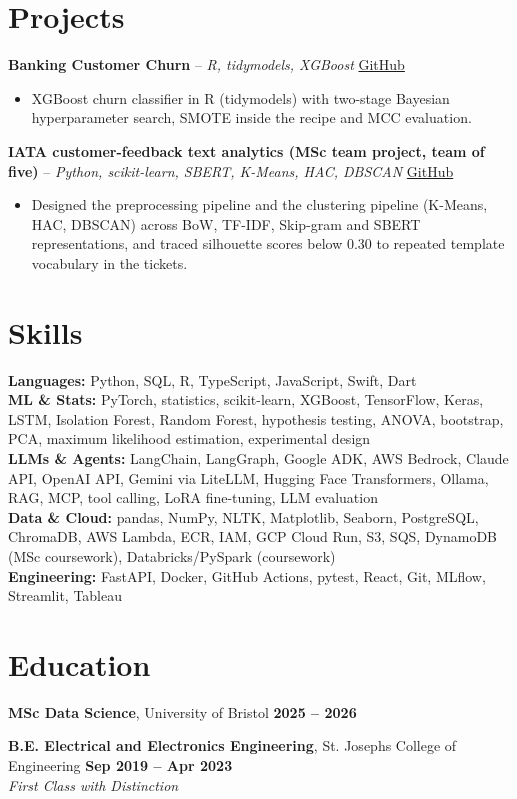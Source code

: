 \documentclass[a4paper,10pt]{article}
\begin{document}
\section{Projects}
\noindent\textbf{Banking Customer Churn} -- \textit{R, tidymodels, XGBoost} \hfill \href{https://github.com/Thiruvel-AP/Banking-Customer-Churn-Prediction}{GitHub}
\begin{itemize}
  \item XGBoost churn classifier in R (tidymodels) with two-stage Bayesian hyperparameter search, SMOTE inside the recipe and MCC evaluation.
\end{itemize}
\noindent\textbf{IATA customer-feedback text analytics (MSc team project, team of five)} -- \textit{Python, scikit-learn, SBERT, K-Means, HAC, DBSCAN} \hfill \href{https://github.com/Thiruvel-AP/TextAnalytics}{GitHub}
\begin{itemize}
  \item Designed the preprocessing pipeline and the clustering pipeline (K-Means, HAC, DBSCAN) across BoW, TF-IDF, Skip-gram and SBERT representations, and traced silhouette scores below 0.30 to repeated template vocabulary in the tickets.
\end{itemize}

\section{Skills}
\textbf{Languages:} Python, SQL, R, TypeScript, JavaScript, Swift, Dart\\
\textbf{ML \& Stats:} PyTorch, statistics, scikit-learn, XGBoost, TensorFlow, Keras, LSTM, Isolation Forest, Random Forest, hypothesis testing, ANOVA, bootstrap, PCA, maximum likelihood estimation, experimental design\\
\textbf{LLMs \& Agents:} LangChain, LangGraph, Google ADK, AWS Bedrock, Claude API, OpenAI API, Gemini via LiteLLM, Hugging Face Transformers, Ollama, RAG, MCP, tool calling, LoRA fine-tuning, LLM evaluation\\
\textbf{Data \& Cloud:} pandas, NumPy, NLTK, Matplotlib, Seaborn, PostgreSQL, ChromaDB, AWS Lambda, ECR, IAM, GCP Cloud Run, S3, SQS, DynamoDB (MSc coursework), Databricks/PySpark (coursework)\\
\textbf{Engineering:} FastAPI, Docker, GitHub Actions, pytest, React, Git, MLflow, Streamlit, Tableau

\section{Education}
\textbf{MSc Data Science}, University of Bristol \hfill \textbf{2025 – 2026}\par
\vspace{2pt}
\textbf{B.E. Electrical and Electronics Engineering}, St. Joseph\textquotesingle{}s College of Engineering \hfill \textbf{Sep 2019 – Apr 2023}\\ \textit{First Class with Distinction}\par
\end{document}
